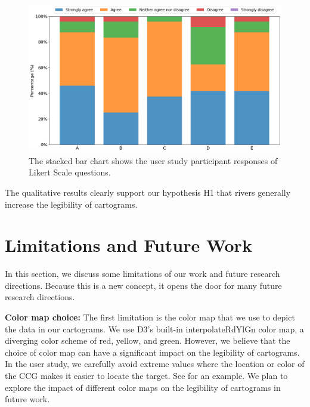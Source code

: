 \documentclass[Afour,sagev,times]{sagej}
\begin{document}
{
\begin{figure}[tb!]
    \centering
    \includegraphics[width=\columnwidth,keepaspectratio]{likert.png}
    \caption{The stacked bar chart shows the user study participant responses of Likert Scale questions.}
    \label{fig:likert}
\end{figure}
}

The qualitative results clearly support our hypothesis H1 that rivers generally increase the legibility of cartograms.

\section{Limitations and Future Work}
\label{sec:{Limitations and Future Work}}

In this section, we discuss some limitations of our work and future research directions.
Because this is a new concept, it opens the door for many future research directions.

\noindent\textbf{Color map choice:} The first limitation is the color map that we use to depict the data in our cartograms.
    We use D3's built-in interpolateRdYlGn color map, a diverging color scheme of red, yellow, and green.
    However, we believe that the choice of color map can have a significant impact on the legibility of cartograms.
    In the user study, we carefully avoid extreme values where the location or color of the CCG makes it easier to locate the target.
    See  for an example. We plan to explore the impact of different color maps on the legibility of cartograms in future work.
\end{document}
